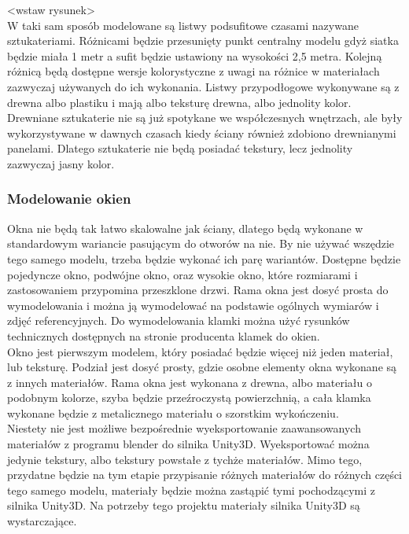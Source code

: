 \documentclass{article} %
\begin{document}
            <wstaw rysunek>
            \\
            
            W taki sam sposób modelowane są listwy podsufitowe czasami nazywane sztukateriami. Różnicami będzie przesunięty punkt centralny modelu gdyż siatka będzie miała 1 metr a sufit będzie ustawiony na wysokości 2,5 metra. Kolejną różnicą będą dostępne wersje kolorystyczne z uwagi na różnice w materiałach zazwyczaj używanych do ich wykonania. Listwy przypodłogowe wykonywane są z drewna albo plastiku i mają albo teksturę drewna, albo jednolity kolor. Drewniane sztukaterie nie są już spotykane we współczesnych wnętrzach, ale były wykorzystywane w dawnych czasach kiedy ściany również zdobiono drewnianymi panelami. Dlatego sztukaterie nie będą posiadać tekstury, lecz jednolity zazwyczaj jasny kolor.
            \\
            
            
        \subsubsection{Modelowanie okien}
            Okna nie będą tak łatwo skalowalne jak ściany, dlatego będą wykonane w standardowym wariancie pasującym do otworów na nie. By nie używać wszędzie tego samego modelu, trzeba będzie wykonać ich parę wariantów. Dostępne będzie pojedyncze okno, podwójne okno, oraz wysokie okno, które rozmiarami i zastosowaniem przypomina przeszklone drzwi. Rama okna jest dosyć prosta do wymodelowania i można ją wymodelować na podstawie ogólnych wymiarów i zdjęć referencyjnych. Do wymodelowania klamki można użyć rysunków technicznych dostępnych na stronie producenta klamek do okien.
            \\
            
            Okno jest pierwszym modelem, który posiadać będzie więcej niż jeden materiał, lub teksturę. Podział jest dosyć prosty, gdzie osobne elementy okna wykonane są z innych materiałów. Rama okna jest wykonana z drewna, albo materiału o podobnym kolorze, szyba będzie przeźroczystą powierzchnią, a cała klamka wykonane będzie z metalicznego materiału o szorstkim wykończeniu. 
            \\
            
            Niestety nie jest możliwe bezpośrednie wyeksportowanie zaawansowanych materiałów z programu blender do silnika Unity3D. Wyeksportować można jedynie tekstury, albo tekstury powstałe z tychże materiałów. Mimo tego, przydatne będzie na tym etapie przypisanie różnych materiałów do różnych części tego samego modelu, materiały będzie można zastąpić tymi pochodzącymi z silnika Unity3D. Na potrzeby tego projektu materiały silnika Unity3D są wystarczające.
            \\
            
\end{document}
